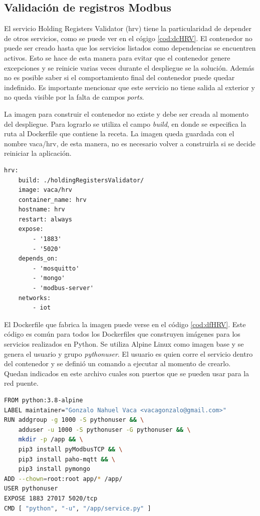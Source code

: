 \subsection{Validación de registros Modbus}

El servicio Holding Registers Validator (hrv) tiene la particularidad de depender de otros servicios, como se puede ver en el cógigo \ref{cod:dcHRV}.
El contenedor no puede ser creado hasta que los servicios listados como dependencias se encuentren activos.
Esto se hace de esta manera para evitar que el contenedor genere excepciones y se reinicie varias veces durante el despliegue se la solución.
Además no es posible saber si el comportamiento final del contenedor puede quedar indefinido.
Es importante mencionar que este servicio no tiene salida al exterior y no queda visible por la falta de campos \emph{ports}.

La imagen para construir el contenedor no existe y debe ser creada al momento del despliegue.
Para lograrlo se utiliza el campo \emph{build}, en donde se especifica la ruta al Dockerfile que contiene la receta.
La imagen queda guardada con el nombre vaca/hrv, de esta manera, no es necesario volver a construirla si se decide reiniciar la aplicación.

\begin{lstlisting}[label=cod:dcHRV,caption=Orquestación del servicio hrv.]
hrv:
	build: ./holdingRegistersValidator/
	image: vaca/hrv
	container_name: hrv
	hostname: hrv
	restart: always
	expose: 
		- '1883'
		- '5020'
	depends_on: 
		- 'mosquitto'
		- 'mongo'
		- 'modbus-server'
	networks: 
		- iot
\end{lstlisting}

El Dockerfile que fabrica la imagen puede verse en el código \ref{cod:dfHRV}.
Este código es común para todos los Dockerfiles que construyen imágenes para los servicios realizados en Python.
Se utiliza Alpine Linux como imagen base y se genera el usuario y grupo \emph{pythonuser}.
El usuario es quien corre el servicio dentro del contenedor y se definió un comando a ejecutar al momento de crearlo.
Quedan indicados en este archivo cuales son puertos que se pueden usar para la red puente.

\begin{lstlisting}[language=bash,label=cod:dfHRV,caption=Dockerfile del servicio hrv.]
FROM python:3.8-alpine
LABEL maintainer="Gonzalo Nahuel Vaca <vacagonzalo@gmail.com>"
RUN addgroup -g 1000 -S pythonuser && \
	adduser -u 1000 -S pythonuser -G pythonuser && \
	mkdir -p /app && \
	pip3 install pyModbusTCP && \
	pip3 install paho-mqtt && \
	pip3 install pymongo
ADD --chown=root:root app/* /app/
USER pythonuser
EXPOSE 1883 27017 5020/tcp
CMD [ "python", "-u", "/app/service.py" ]
\end{lstlisting}

